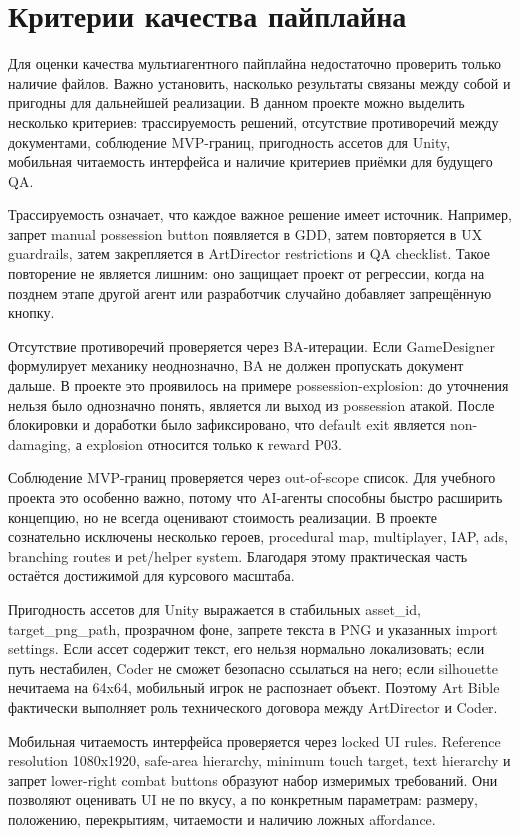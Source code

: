 \documentclass[a4paper,12pt]{report}
\begin{document}
\section{Критерии качества пайплайна}

Для оценки качества мультиагентного пайплайна недостаточно проверить только наличие файлов. Важно установить, насколько результаты связаны между собой и пригодны для дальнейшей реализации. В данном проекте можно выделить несколько критериев: трассируемость решений, отсутствие противоречий между документами, соблюдение MVP-границ, пригодность ассетов для Unity, мобильная читаемость интерфейса и наличие критериев приёмки для будущего QA.

Трассируемость означает, что каждое важное решение имеет источник. Например, запрет manual possession button появляется в GDD, затем повторяется в UX guardrails, затем закрепляется в ArtDirector restrictions и QA checklist. Такое повторение не является лишним: оно защищает проект от регрессии, когда на позднем этапе другой агент или разработчик случайно добавляет запрещённую кнопку.

Отсутствие противоречий проверяется через BA-итерации. Если GameDesigner формулирует механику неоднозначно, BA не должен пропускать документ дальше. В проекте это проявилось на примере possession-explosion: до уточнения нельзя было однозначно понять, является ли выход из possession атакой. После блокировки и доработки было зафиксировано, что default exit является non-damaging, а explosion относится только к reward P03.

Соблюдение MVP-границ проверяется через out-of-scope список. Для учебного проекта это особенно важно, потому что AI-агенты способны быстро расширить концепцию, но не всегда оценивают стоимость реализации. В проекте сознательно исключены несколько героев, procedural map, multiplayer, IAP, ads, branching routes и pet/helper system. Благодаря этому практическая часть остаётся достижимой для курсового масштаба.

Пригодность ассетов для Unity выражается в стабильных asset\_id, target\_png\_path, прозрачном фоне, запрете текста в PNG и указанных import settings. Если ассет содержит текст, его нельзя нормально локализовать; если путь нестабилен, Coder не сможет безопасно ссылаться на него; если silhouette нечитаема на 64x64, мобильный игрок не распознает объект. Поэтому Art Bible фактически выполняет роль технического договора между ArtDirector и Coder.

Мобильная читаемость интерфейса проверяется через locked UI rules. Reference resolution 1080x1920, safe-area hierarchy, minimum touch target, text hierarchy и запрет lower-right combat buttons образуют набор измеримых требований. Они позволяют оценивать UI не по вкусу, а по конкретным параметрам: размеру, положению, перекрытиям, читаемости и наличию ложных affordance.
\end{document}
